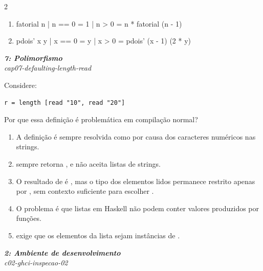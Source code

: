 \documentclass[a4paper,10pt,brazil]{article}
\begin{document}
\begin{multicols}{2}
\begin{enumerate}
  \item \begin{haskellcode}
fatorial n
  | n == 0 = 1
  | n > 0  = n * fatorial (n - 1)
\end{haskellcode}

  \item \begin{haskellcode}
pdois' x y
  | x == 0 = y
  | x > 0  = pdois' (x - 1) (2 * y)
\end{haskellcode}


\end{enumerate}

\begin{flushright}
  \footnotesize
  \textit{\textbf{7: Polimorfismo}}\\
  \textit{cap07-defaulting-length-read}\\

\end{flushright}
Considere:

\begin{verbatim}
r = length [read "10", read "20"]
\end{verbatim}

Por que essa definição é problemática em compilação normal?

\begin{enumerate}
  \item A definição é sempre resolvida como \haskellinline{[Int]} por causa dos caracteres numéricos nas strings.
  \item {} sempre retorna , e  não aceita listas de strings.
  \item O resultado de  é , mas o tipo dos elementos lidos permanece restrito apenas por , sem contexto suficiente para escolher .
  \item O problema é que listas em Haskell não podem conter valores produzidos por funções.
  \item {} exige que os elementos da lista sejam instâncias de .

\end{enumerate}

\begin{flushright}
  \footnotesize
  \textit{\textbf{2: Ambiente de desenvolvimento}}\\
  \textit{c02-ghci-inspecao-02}\\


\end{flushright}
\end{multicols}
\end{document}
